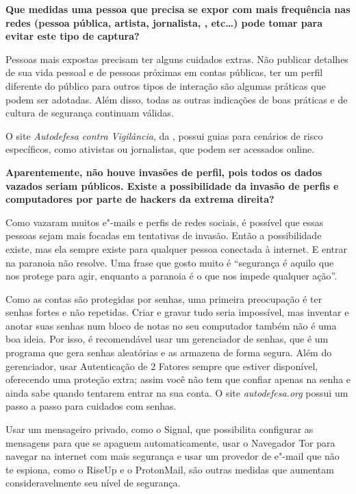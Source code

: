 \bigskip

\noindent{}\textbf{Que medidas uma pessoa que precisa se expor com mais frequência
nas redes (pessoa pública, artista, jornalista, , etc\ldots{}) pode tomar
para evitar este tipo de captura?}

Pessoas mais expostas precisam ter alguns cuidados
extras. Não publicar detalhes de sua vida pessoal e de pessoas próximas
em contas públicas, ter um perfil diferente do público para outros tipos
de interação são algumas práticas que podem ser adotadas. Além disso,
todas as outras indicações de boas práticas e de cultura de segurança
continuam válidas.

O site \emph{Autodefesa contra
Vigilância}, da , possui guias para cenários de risco
específicos, como ativistas ou jornalistas, que podem ser acessados
online.

\bigskip

\noindent{}\textbf{Aparentemente, não houve invasões de perfil, pois todos os dados
vazados seriam públicos. Existe a possibilidade da invasão de perfis e
computadores por parte de hackers da extrema direita?}

Como vazaram muitos e"-mails e perfis de redes
sociais, é possível que essas pessoas sejam mais focadas em tentativas de
invasão. Então a possibilidade existe, mas ela sempre existe para
qualquer pessoa conectada à internet. E entrar na paranoia não resolve.
Uma frase que gosto muito é ``segurança é aquilo que nos protege para
agir, enquanto a paranoia é o que nos impede qualquer ação''.

Como as contas são protegidas por senhas, uma primeira preocupação é ter
senhas fortes e não repetidas. Criar e gravar tudo seria impossível, mas
inventar e anotar suas senhas num bloco de notas no seu computador
também não é uma boa ideia. Por isso, é recomendável usar um gerenciador
de senhas, que é um programa que gera senhas aleatórias e as armazena de
forma segura. Além do gerenciador, usar Autenticação de 2 Fatores sempre
que estiver disponível, oferecendo uma proteção extra; assim você não
tem que confiar apenas na senha e ainda sabe quando tentarem entrar na
sua conta. O site \emph{autodefesa.org} possui
um passo a passo
para cuidados com senhas.

Usar um mensageiro privado, como o
Signal, que possibilita configurar as
mensagens para que se apaguem automaticamente, usar o
Navegador Tor para navegar na
internet com mais segurança e usar um provedor de e"-mail que não te
espiona, como o RiseUp e o
ProtonMail, são outras
medidas que aumentam consideravelmente seu nível de segurança.

